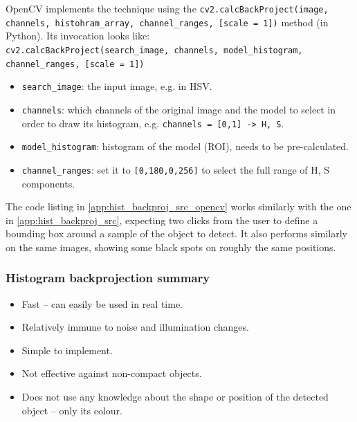 \documentclass[a4paper]{article}
\begin{document}
OpenCV implements the technique using the \texttt{cv2.calcBackProject(image, channels, histohram_array, channel_ranges, [scale = 1])} method (in Python). Its invocation looks like:\\
\texttt{cv2.calcBackProject(search_image, channels, model_histogram, channel_ranges, [scale = 1])}
\begin{itemize}
    \item \texttt{search_image}: the input image, e.g. in HSV.
    \item \texttt{channels}: which channels of the original image and the model to select in order to draw its histogram, e.g. \texttt{channels = [0,1] -> H, S}.
    \item \texttt{model_histogram}: histogram of the model (ROI), needs to be pre-calculated.
    \item \texttt{channel_ranges}: set it to \texttt{[0,180,0,256]} to select the full range of H, S components.
\end{itemize}
The code listing in \ref{app:hist_backproj_src_opencv} works similarly with the one in \ref{app:hist_backproj_src}, expecting two clicks from the user to define a bounding box around a sample of the object to detect. It also performs similarly on the same images, showing some black spots on roughly the same positions.


\subsubsection{Histogram backprojection summary}
\begin{multicols}{2}
    \begin{itemize}
        \item[\textcolor{DarkPink}{\ding{51}}] Fast -- can easily be used in real time.
        \item[\textcolor{DarkPink}{\ding{51}}] Relatively immune to noise and illumination changes.
        \item[\textcolor{DarkPink}{\ding{51}}] Simple to implement.
    \end{itemize}
    
    \columnbreak
    \begin{itemize}
        \item[\textcolor{DarkPink}{\ding{55}}] Not effective against non-compact objects.
        \item[\textcolor{DarkPink}{\ding{55}}] Does not use any knowledge about the shape or position of the detected object -- only its colour.
    \end{itemize}
\end{multicols}
\end{document}

